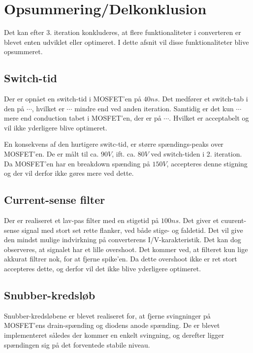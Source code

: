 
\section{Opsummering/Delkonklusion}
Det kan efter 3. iteration konkluderes, at flere funktionaliteter i converteren er blevet enten udviklet eller optimeret. I dette afsnit vil disse funktionaliteter blive opsummeret. 

\subsection{Switch-tid}
Der er opnået en switch-tid i MOSFET'en på $40ns$. Det medfører et switch-tab i den på $\cdots$, hvilket er $\cdots$ mindre end ved anden iteration. Samtidig er det kun $\cdots$ mere end conduction tabet i MOSFET'en, der er på $\cdots$. Hvilket er acceptabelt og vil ikke yderligere blive optimeret. 


En konsekvens af den hurtigere switc-tid, er større spændings-peaks over MOSFET'en. De er målt til ca. $90V$, ift. ca. $80V$ ved switch-tiden i 2. iteration. Da MOSFET'en har en breakdown spænding på $150V$, accepteres denne stigning og der vil derfor ikke gøres mere ved dette.


\subsection{Current-sense filter}
Der er realiseret et lav-pas filter med en stigetid på $100ns$. Det giver et cuurent-sense signal med stort set rette flanker, ved både stige- og faldetid. Det vil give den mindst mulige indvirkning på converterens I/V-karakteristik. Det kan dog observeres, at signalet har et lille overshoot. Det kommer ved, at filteret kun lige akkurat filtrer nok, for at fjerne spike'en. Da dette overshoot ikke er ret stort accepteres dette, og derfor vil det ikke blive yderligere optimeret.


\subsection{Snubber-kredsløb}
Snubber-kredsløbene er blevet realiseret for, at fjerne svingninger på MOSFET'ens drain-spænding og diodens anode spænding. De er blevet implementeret således der kommer en enkelt svingning, og derefter ligger spændingen sig på det forventede stabile niveau. 


